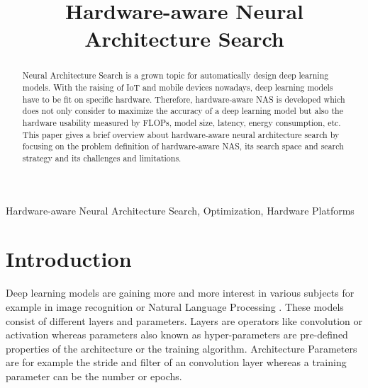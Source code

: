 \documentclass[conference]{IEEEtran}
\begin{document}
\title{Hardware-aware Neural Architecture Search\\}

\author{
}

\maketitle

\begin{abstract}
Neural Architecture Search is a grown topic for automatically design deep learning models. With the raising of IoT and mobile devices nowadays, deep learning models have to be fit on specific hardware. Therefore, hardware-aware NAS is developed which does not only consider to maximize the accuracy of a deep learning model but also the hardware usability measured by FLOPs, model size, latency, energy consumption, etc. This paper gives a brief overview about hardware-aware neural architecture search by focusing on the problem definition of hardware-aware NAS, its search space and search strategy and its challenges and limitations.  
\end{abstract}

\begin{IEEEkeywords}
Hardware-aware Neural Architecture Search, Optimization, Hardware Platforms
\end{IEEEkeywords}

\section{Introduction}
\label{section:Introduction}
Deep learning models are gaining more and more interest in various subjects for example in image recognition \cite{bib2} or Natural Language Processing \cite{bib3}. These models consist of different layers and parameters. Layers are operators like convolution or activation whereas parameters also known as hyper-parameters are pre-defined properties of the architecture or the training algorithm. Architecture Parameters are for example the stride and filter of an convolution layer whereas a training parameter can be the number or epochs.
\end{document}
